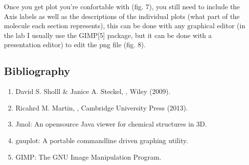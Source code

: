 \documentclass[letterpaper,10pt,english,openany,oneside]{sphinxmanual}
\begin{document}
\sphinxAtStartPar
Once you get plot you’re confortable with (fig. 7), you still need to include the Axis labels as well as the descriptions of the individual plots (what part of the molecule each section represents), this can be done with any graphical editor (in the lab I usually use the GIMP{[}5{]} package, but it can be done with a presentation editor) to edit the png file (fig. 8).

\begin{figure}[htbp]
\centering

\noindent{}
\end{figure}

\begin{figure}[htbp]
\centering

\noindent{}
\end{figure}


\subsection{Bibliography}
\label{\detokenize{tutorials/ddos/density_of_states:bibliography}}\begin{enumerate}
%
\item {} 
\sphinxAtStartPar
David S. Sholll \&  Janice A. Steckel, , Wiley (2009).

\item {} 
\sphinxAtStartPar
Ricahrd M. Martin, , Cambridge University Press (2013).

\item {} 
\sphinxAtStartPar
Jmol: An open\sphinxhyphen{}source Java viewer for chemical structures in 3D. 

\item {} 
\sphinxAtStartPar
gnuplot: A portable command\sphinxhyphen{}line driven graphing utility. 

\item {} 
\sphinxAtStartPar
GIMP: The GNU Image Manipulation Program. 

\end{enumerate}

\sphinxstepscope
\end{document}

